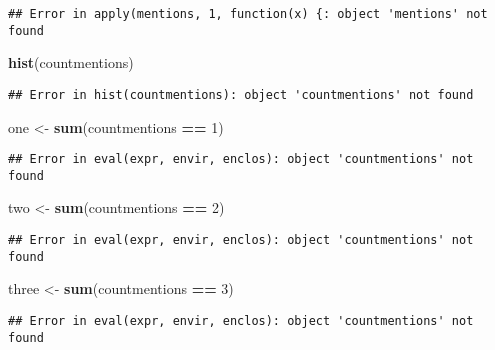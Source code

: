 \documentclass[]{article}
\newenvironment{Shaded}{\begin{snugshade}}{\end{snugshade}}
\newcommand{\KeywordTok}[1]{\textcolor[rgb]{0.13,0.29,0.53}{\textbf{#1}}}
\newcommand{\DecValTok}[1]{\textcolor[rgb]{0.00,0.00,0.81}{#1}}
\newcommand{\StringTok}[1]{\textcolor[rgb]{0.31,0.60,0.02}{#1}}
\newcommand{\OperatorTok}[1]{\textcolor[rgb]{0.81,0.36,0.00}{\textbf{#1}}}
\newcommand{\NormalTok}[1]{#1}
\begin{document}
\begin{verbatim}
## Error in apply(mentions, 1, function(x) {: object 'mentions' not found
\end{verbatim}

\begin{Shaded}
\begin{Highlighting}[]
\KeywordTok{hist}\NormalTok{(countmentions)}
\end{Highlighting}
\end{Shaded}

\begin{verbatim}
## Error in hist(countmentions): object 'countmentions' not found
\end{verbatim}

\begin{Shaded}
\begin{Highlighting}[]
\NormalTok{one <-}\StringTok{ }\KeywordTok{sum}\NormalTok{(countmentions }\OperatorTok{==}\StringTok{ }\DecValTok{1}\NormalTok{)}
\end{Highlighting}
\end{Shaded}

\begin{verbatim}
## Error in eval(expr, envir, enclos): object 'countmentions' not found
\end{verbatim}

\begin{Shaded}
\begin{Highlighting}[]
\NormalTok{two <-}\StringTok{ }\KeywordTok{sum}\NormalTok{(countmentions }\OperatorTok{==}\StringTok{ }\DecValTok{2}\NormalTok{)}
\end{Highlighting}
\end{Shaded}

\begin{verbatim}
## Error in eval(expr, envir, enclos): object 'countmentions' not found
\end{verbatim}

\begin{Shaded}
\begin{Highlighting}[]
\NormalTok{three <-}\StringTok{ }\KeywordTok{sum}\NormalTok{(countmentions }\OperatorTok{==}\StringTok{ }\DecValTok{3}\NormalTok{)}
\end{Highlighting}
\end{Shaded}

\begin{verbatim}
## Error in eval(expr, envir, enclos): object 'countmentions' not found
\end{verbatim}
\end{document}
